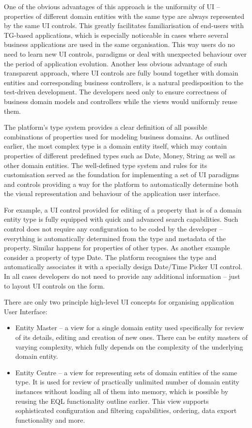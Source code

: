   One of the obvious advantages of this approach is the uniformity of UI -- properties of different domain entities with the same type are always represented by the same UI controls.
  This greatly facilitates familiarisation of end-users with TG-based applications, which is especially noticeable in cases where several business applications are used in the same organisation.
  This way users do no need to learn new UI controls, paradigms or deal with unexpected behaviour over the period of application evolution.
  Another less obvious advantage of such transparent approach, where UI controls are fully bound together with domain entities and corresponding business controllers, is a natural predisposition to the test-driven development.
  The developers need only to ensure correctness of business domain models and controllers while the views would uniformly reuse them.

  The platform's type system provides a clear definition of all possible combinations of properties used for modeling business domains.
  As outlined earlier, the most complex type is a domain entity itself, which may contain properties of different predefined types such as Date, Money, String as well as other domain entities.
  The well-defined type system and rules for its customisation served as the foundation for implementing a set of UI paradigms and controls providing a way for the platform to automatically determine both the visual representation and behaviour of the application user interface.
    
  For example, a UI control provided for editing of a property that is of a domain entity type is fully equipped with quick and advanced search capabilities.
  Such control does not require any configuration to be coded by the developer -- everything is automatically determined from the type and metadata of the property.
  Similar happens for properties of other types.
  As another example consider a property of type Date.
  The platform recognises the type and automatically associates it with a specially design Date/Time Picker UI control.
  In all cases developers do not need to provide any additional information -- just to layout UI controls on the form.
  
  There are only two principle high-level UI concepts for organising application User Interface:
  \begin{itemize}
   \item Entity Master -- a view for a single domain entity used specifically for review of its details, editing and creation of new ones.
	 There can be entity masters of varying complexity, which fully depends on the complexity of the underlying domain entity.
    \item Entity Centre -- a view for representing sets of domain entities of the same type. 
	  It is used for review of practically unlimited number of domain entity instances without loading all of them into memory, which is possible by reusing the EQL functionality outline earlier.
	  This view supports sophisticated configuration and filtering capabilities, ordering, data export functionality and more.
  \end{itemize}
  
